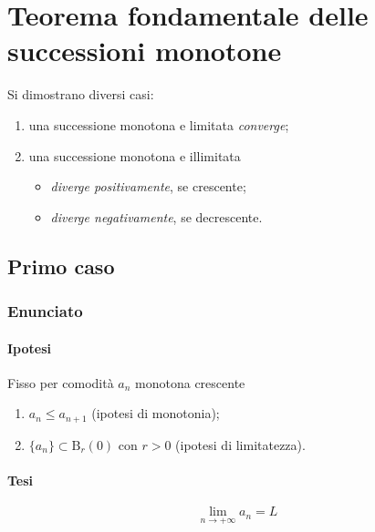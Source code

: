\documentclass[../../dimostrazioni]{subfiles}
\begin{document}
    \chapter{Teorema fondamentale delle successioni monotone}
    \label{teoFondSuccMono}

        Si dimostrano diversi casi:
        \begin{enumerate}
            \indentitem \item una successione monotona e limitata \emph{converge};
            \indentitem \item una successione monotona e illimitata
                \begin{itemize}
                    \indentitem \item \emph{diverge positivamente}, se crescente;
                    \indentitem \item \emph{diverge negativamente}, se decrescente.
                \end{itemize}
        \end{enumerate}            


        \section*{Primo caso}
            
            \subsection*{Enunciato}
                
                \subsubsection*{Ipotesi}
                         
                Fisso per comodità \(a_n\) monotona crescente

                \begin{enumerate}
                    \indentitem \item \(a_n \leqslant a_{n+1}\) (ipotesi di monotonia);
                    \indentitem \item \(\{a_n\} \subset \mathrm{B}_r(0)\) con \(r > 0 \) (ipotesi di limitatezza).
                \end{enumerate}
                
                \subsubsection*{Tesi}
                    \[\lim_{n \to +\infty} a_n = L\]
            
\end{document}
